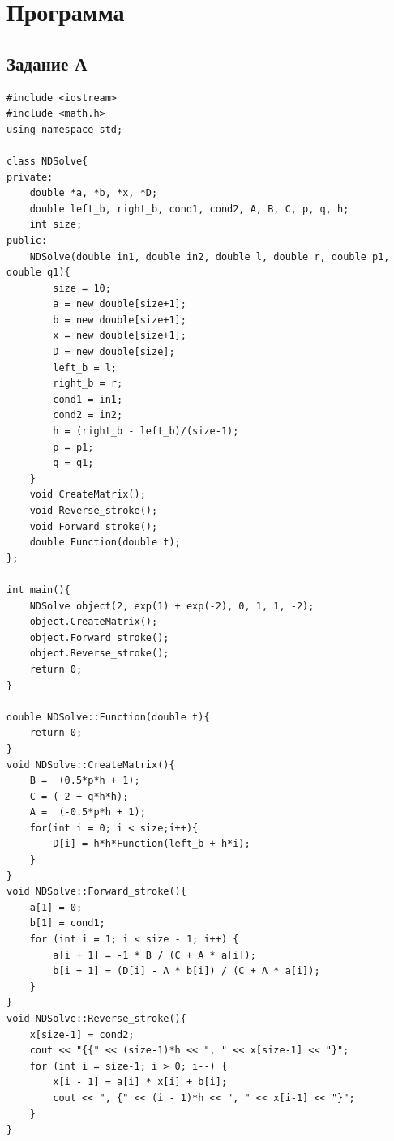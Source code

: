 \documentclass[
11pt,
master, %
subf, %
href, %
colorlinks=true, %
times, %
]{disser}
\begin{document}
\newpage
\section{Программа}
\subsection{Задание А}
{\footnotesize
\begin{verbatim}
#include <iostream>
#include <math.h>
using namespace std;

class NDSolve{
private:
    double *a, *b, *x, *D;
    double left_b, right_b, cond1, cond2, A, B, C, p, q, h;
    int size;
public:
    NDSolve(double in1, double in2, double l, double r, double p1, double q1){
        size = 10;
        a = new double[size+1];
        b = new double[size+1];
        x = new double[size+1];
        D = new double[size];
        left_b = l;
        right_b = r;
        cond1 = in1;
        cond2 = in2;
        h = (right_b - left_b)/(size-1);
        p = p1;
        q = q1;
    }
    void CreateMatrix();
    void Reverse_stroke();
    void Forward_stroke();
    double Function(double t);
};

int main(){
    NDSolve object(2, exp(1) + exp(-2), 0, 1, 1, -2);
    object.CreateMatrix();
    object.Forward_stroke();
    object.Reverse_stroke();
    return 0;
}

double NDSolve::Function(double t){
    return 0;
}
void NDSolve::CreateMatrix(){
    B =  (0.5*p*h + 1);
    C = (-2 + q*h*h);
    A =  (-0.5*p*h + 1);
    for(int i = 0; i < size;i++){
        D[i] = h*h*Function(left_b + h*i);
    }
}
void NDSolve::Forward_stroke(){
    a[1] = 0;
    b[1] = cond1;
    for (int i = 1; i < size - 1; i++) {
        a[i + 1] = -1 * B / (C + A * a[i]);
        b[i + 1] = (D[i] - A * b[i]) / (C + A * a[i]);
    }
}
void NDSolve::Reverse_stroke(){
    x[size-1] = cond2;
    cout << "{{" << (size-1)*h << ", " << x[size-1] << "}";
    for (int i = size-1; i > 0; i--) {
        x[i - 1] = a[i] * x[i] + b[i];
        cout << ", {" << (i - 1)*h << ", " << x[i-1] << "}";
    }
}
\end{verbatim}
}

\newpage
\end{document}
